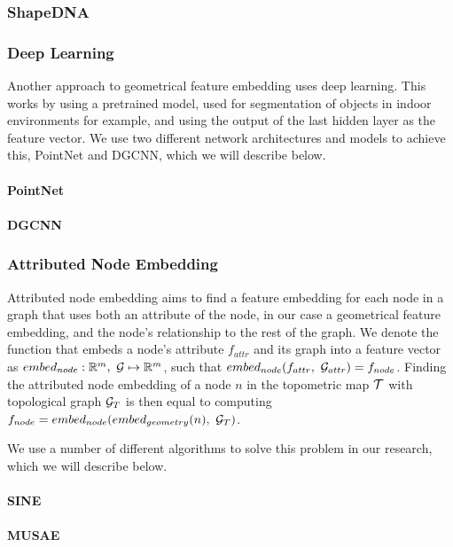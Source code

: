 \subsubsection{ShapeDNA}

\subsubsection{Deep Learning}
Another approach to geometrical feature embedding uses deep learning. This works by using a pretrained model, used for segmentation of objects in indoor environments for example, and using the output of the last hidden layer as the feature vector. We use two different network architectures and models to achieve this, PointNet and DGCNN, which we will describe below. 

\paragraph{PointNet}
\paragraph{DGCNN}

\subsubsection{Attributed Node Embedding}

Attributed node embedding aims to find a feature embedding for each node in a graph that uses both an attribute of the node, in our case a geometrical feature embedding, and the node's relationship to the rest of the graph. We denote the function that embeds a node's attribute \(f_{attr}\) and its graph into a feature vector as \(embed_{node}: \mathbb{R}^m,\ \mathcal{G} \mapsto \mathbb{R}^m\), such that \(embed_{node}(f_{attr},\ \mathcal{G}_{attr}) = f_{node}\). Finding the attributed node embedding of a node \(n\) in the topometric map \(\mathcal{T}\) with topological graph \(\mathcal{G}_{T}\) is then equal to computing \(f_{node}=embed_{node}(embed_{geometry}(n),\ \graph_{T})\).

We use a number of different algorithms to solve this problem in our research, which we will describe below.

\paragraph{SINE}
\paragraph{MUSAE}
